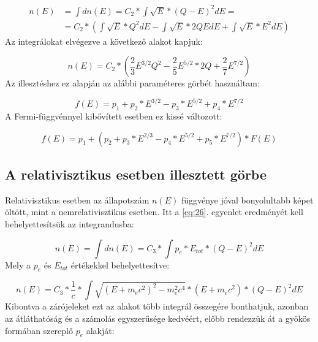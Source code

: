 \begin{align} \label{eq:27}
n \left( E \right)
&=
\int dn \left( E \right)
=
C_{2} * \int \sqrt{E} * \left( Q - E \right)^{2} dE
= \nonumber \\
&=
C_{2} *
\left(
\int \sqrt{E} * Q^2 dE
-
\int \sqrt{E} * 2QE dE
+
\int \sqrt{E} * E^{2} dE
\right)
\end{align}
Az integrálokat elvégezve a következő alakot kapjuk:

\begin{equation} \label{eq:28}
\boxed{
n \left( E \right)
=
C_{2} *
\left(
\frac{2}{3} E^{3/2} Q^{2} - \frac{2}{5} E^{5/2} * 2Q + \frac{2}{7} E^{7/2}
\right)
}
\end{equation}
Az illesztéshez ez alapján az alábbi paraméteres görbét használtam:

\begin{equation} \label{eq:29}
\boxed{
f \left( E \right)
=
p_{1} + p_{2} * E^{3/2} - p_{3} * E^{5/2} + p_{4} * E^{7/2}
}
\end{equation}
A Fermi-függvénnyel kibővített esetben ez kissé változott:

\begin{equation} \label{eq:30}
\boxed{
f \left( E \right)
=
p_{1} + \left( p_{2} + p_{3} * E^{2/3} - p_{4} * E^{5/2} + p_{5} * E^{7/2} \right) * F \left( E \right)
}
\end{equation}


\subsection{A relativisztikus esetben illesztett görbe}
Relativisztikus esetben az állapotszám $n \left( E \right)$ függvénye jóval bonyolultabb képet öltött, mint a nemrelativisztikus esetben. Itt a \ref{eq:26}. egyenlet eredményét kell behelyettesítsük az integrandusba:

\begin{equation} \label{eq:31}
n \left( E \right)
=
\int dn \left( E \right)
=
C_{3} * \int p_{e} * E_{tot} * \left( Q - E \right)^{2} dE
\end{equation}
Mely a $p_{e}$ és $E_{tot}$ értékekkel behelyettesítve:

\begin{equation} \label{eq:32}
n \left( E \right)
=
C_{3} * \frac{1}{c} * \int
\sqrt{\left( E + m_{e} c^{2} \right)^{2} - m_{e}^{2} c^{4}}
*
\left( E + m_{e} c^{2} \right)
*
\left( Q - E \right)^{2} dE
\end{equation}
Kibontva a zárójeleket ezt az alakot több integrál összegére bonthatjuk, azonban az átláthatóság és a számolás egyszerűsége kedvéért, előbb rendezzük át a gyökös formában szereplő $p_{e}$ alakját:


